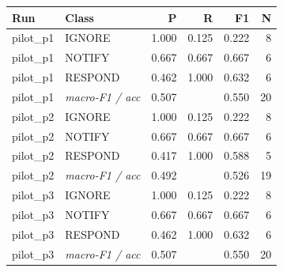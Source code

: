 \begin{tabular}{llrrrr}
\toprule
Run & Class & P & R & F1 & N \\
\midrule
pilot_p1 & IGNORE & 1.000 & 0.125 & 0.222 & 8 \\
pilot_p1 & NOTIFY & 0.667 & 0.667 & 0.667 & 6 \\
pilot_p1 & RESPOND & 0.462 & 1.000 & 0.632 & 6 \\
pilot_p1 & \textit{macro-F1 / acc} & 0.507 &  & 0.550 & 20 \\
pilot_p2 & IGNORE & 1.000 & 0.125 & 0.222 & 8 \\
pilot_p2 & NOTIFY & 0.667 & 0.667 & 0.667 & 6 \\
pilot_p2 & RESPOND & 0.417 & 1.000 & 0.588 & 5 \\
pilot_p2 & \textit{macro-F1 / acc} & 0.492 &  & 0.526 & 19 \\
pilot_p3 & IGNORE & 1.000 & 0.125 & 0.222 & 8 \\
pilot_p3 & NOTIFY & 0.667 & 0.667 & 0.667 & 6 \\
pilot_p3 & RESPOND & 0.462 & 1.000 & 0.632 & 6 \\
pilot_p3 & \textit{macro-F1 / acc} & 0.507 &  & 0.550 & 20 \\
\bottomrule
\end{tabular}
